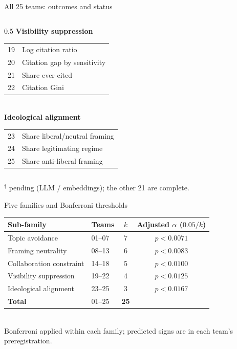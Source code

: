 \documentclass[aspectratio=169,11pt]{beamer}
\begin{document}
\begin{frame}{All 25 teams: outcomes and status}
\begin{columns}[T]
\begin{column}{0.5\textwidth}
      \textbf{Visibility suppression}\\[0.2em]
      \begin{tabular}{@{}r@{\;}l@{}}
        19 & Log citation ratio\\
        20 & Citation gap by sensitivity\\
        21 & Share ever cited\\
        22 & Citation Gini\\
      \end{tabular}\\[0.5em]
      \textbf{Ideological alignment}\\[0.2em]
      \begin{tabular}{@{}r@{\;}l@{}}
        23 & Share liberal/neutral framing\\
        24 & Share legitimating regime\\
        25 & Share anti-liberal framing\\
      \end{tabular}
    \end{column}
  \end{columns}
  \vspace{0.3em}
  {$^\dagger$ pending (LLM / embeddings); the other 21 are complete.}\hfill\hyperlink{ap:toc}{}
\end{frame}

\begin{frame}{Five families and Bonferroni thresholds}
  \hypertarget{ap:families}{}
  \small
  \centering
  \begin{tabular}{llcc}
    \toprule
    Sub-family & Teams & $k$ & Adjusted $\alpha$ ($0.05/k$)\\
    \midrule
    Topic avoidance          & 01--07 & 7 & $p < 0.0071$\\
    Framing neutrality       & 08--13 & 6 & $p < 0.0083$\\
    Collaboration constraint & 14--18 & 5 & $p < 0.0100$\\
    Visibility suppression   & 19--22 & 4 & $p < 0.0125$\\
    Ideological alignment    & 23--25 & 3 & $p < 0.0167$\\
    \midrule
    \textbf{Total}           & 01--25 & \textbf{25} & \\
    \bottomrule
  \end{tabular}\\[0.8em]
  {\small Bonferroni applied within each family; predicted signs are in each team's preregistration.}
  \vfill
  \hfill\hyperlink{ap:toc}{}
\end{frame}
\end{document}
